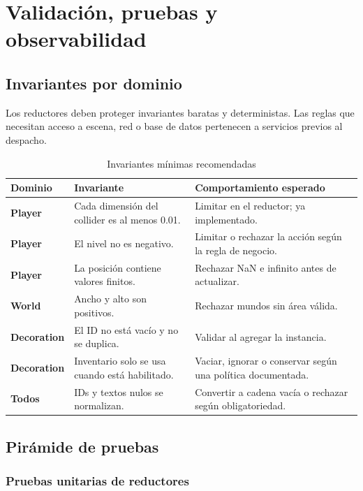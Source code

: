 \section{Validación, pruebas y observabilidad}

\subsection{Invariantes por dominio}

Los reductores deben proteger invariantes baratas y deterministas. Las reglas que necesitan acceso a escena, red o base de datos pertenecen a servicios previos al despacho.

\begin{table}[H]
\centering
\caption{Invariantes mínimas recomendadas}
\begin{tabularx}{\textwidth}{>{\bfseries}p{3cm}X X}
\toprule
Dominio & Invariante & Comportamiento esperado \\
\midrule
Player & Cada dimensión del collider es al menos 0.01. & Limitar en el reductor; ya implementado. \\
Player & El nivel no es negativo. & Limitar o rechazar la acción según la regla de negocio. \\
Player & La posición contiene valores finitos. & Rechazar NaN e infinito antes de actualizar. \\
World & Ancho y alto son positivos. & Rechazar mundos sin área válida. \\
Decoration & El ID no está vacío y no se duplica. & Validar al agregar la instancia. \\
Decoration & Inventario solo se usa cuando está habilitado. & Vaciar, ignorar o conservar según una política documentada. \\
Todos & IDs y textos nulos se normalizan. & Convertir a cadena vacía o rechazar según obligatoriedad. \\
\bottomrule
\end{tabularx}
\end{table}

\subsection{Pirámide de pruebas}

\subsubsection{Pruebas unitarias de reductores}

